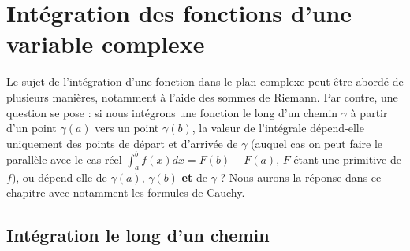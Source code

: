 \chapter[Intégration complexe]{Intégration des fonctions d'une variable complexe}
Le sujet de l'intégration d'une fonction dans le plan complexe peut être abordé de plusieurs manières, notamment à l'aide des sommes de Riemann. Par contre, une question se pose : si nous intégrons une fonction le long d'un chemin $\gamma$ à partir d'un point $\gamma(a)$ vers un point $\gamma(b)$, la valeur de l'intégrale dépend-elle uniquement des points de départ et d'arrivée de $\gamma$ (auquel cas on peut faire le parallèle avec le cas réel $\int_a^b f(x) dx = F(b) - F(a)$, $F$ étant une primitive de $f$), ou dépend-elle de $\gamma(a)$, $\gamma(b)$ \textbf{et} de $\gamma$ ? Nous aurons la réponse dans ce chapitre avec notamment les formules de Cauchy.

\section{Intégration le long d'un chemin}









